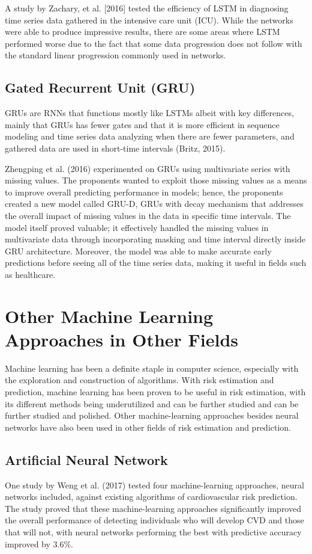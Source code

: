 ﻿\documentclass[10pt,11pt,12pt,oneside]{book}
\begin{document}
        A study by Zachary, et al. [2016] tested the efficiency of LSTM in diagnosing time series data gathered in the intensive care unit (ICU). While the networks were able to produce impressive results, there are some areas where LSTM performed worse due to the fact that some data progression does not follow with the standard linear progression commonly used in networks. \cite{DBLP:journals/corr/LiptonKEW15}
        \subsection{Gated Recurrent Unit (GRU)}
        GRUs are RNNs that functions mostly like LSTMs albeit with key differences, mainly that GRUs has fewer gates and that it is more efficient in sequence modeling and time series data analyzing when there are fewer parameters, and gathered data are used in short-time intervals (Britz, 2015). \cite{britz_2016}

        Zhengping et al. (2016) experimented on GRUs using multivariate series with missing values. The proponents wanted to exploit those missing values as a means to improve overall predicting performance in models; hence, the proponents created a new model called GRU-D, GRUs with decay mechanism that addresses the overall impact of missing values in the data in specific time intervals. The model itself proved valuable; it effectively handled the missing values in multivariate data through incorporating masking and time interval directly inside GRU architecture. Moreover, the model was able to make accurate early predictions before seeing all of the time series data, making it useful in fields such as healthcare. \cite{DBLP:journals/corr/ChePCSL16}
    \section{Other Machine Learning Approaches in Other Fields}
    Machine learning has been a definite staple in computer science, especially with the exploration and construction of algorithms. With risk estimation and prediction, machine learning has been proven to be useful in risk estimation, with its different methods being underutilized and can be further studied and can be further studied and polished. \cite{Kruppa2012} Other machine-learning approaches besides neural networks have also been used in other fields of risk estimation and prediction.
        \subsection{Artificial Neural Network}
        One study by Weng et al. (2017) tested four machine-learning approaches, neural networks included, against existing algorithms of cardiovascular risk prediction. The study proved that these machine-learning approaches significantly improved the overall performance of detecting individuals who will develop CVD and those that will not, with neural networks performing the best with predictive accuracy improved by 3.6\%. \cite{Weng2017}
\end{document}
